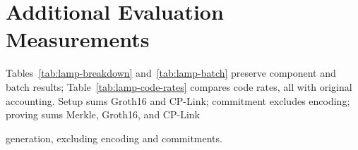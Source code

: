 \documentclass[conference,compsoc]{IEEEtran}
\makeatletter
\newcommand{\protocol}{\textsf{LAMP}}   %
\theoremstyle{plain}
\theoremstyle{definition}
\theoremstyle{remark}
\providecommand{\DIFaddtex}[1]{{\protect\color{blue}\uwave{#1}}} %
\providecommand{\DIFdeltex}[1]{{\protect\color{red}\sout{#1}}} %
\providecommand{\DIFaddbegin}{} %
\providecommand{\DIFaddend}{} %
\providecommand{\DIFdelbegin}{} %
\providecommand{\DIFdelend}{} %
\providecommand{\DIFadd}[1]{\texorpdfstring{\DIFaddtex{#1}}{#1}} %
\providecommand{\DIFdel}[1]{\texorpdfstring{\DIFdeltex{#1}}{}} %
\let\sout@orig\sout %
\renewcommand{\sout}[1]{\ifmmode\text{\sout@orig{\ensuremath{#1}}}\else\sout@orig{#1}\fi} %
\renewcommand{\DIFaddtex}[1]{{\protect\color{DiffBlue}#1}}
\renewcommand{\DIFdeltex}[1]{}
\makeatother
\begin{document}
\section{\DIFdelbegin \DIFdel{LAMP Results Across Code Rates}\DIFdelend \DIFaddbegin \DIFadd{Additional Evaluation Measurements}\DIFaddend }
\label{app:lamp-code-rates}
\DIFaddbegin \label{app:component-batch}
\DIFaddend 

\DIFaddbegin \DIFadd{Tables~\ref{tab:lamp-breakdown} and~\ref{tab:lamp-batch} preserve component and
batch results; }\DIFaddend Table~\ref{tab:lamp-code-rates} \DIFdelbegin \DIFdel{reports the performance of \(\protocol\) for
code rates\(\rho\in\{1/2,1/4,1/8\}\). The setup time is the sum of the
}\DIFdelend \DIFaddbegin \DIFadd{compares code rates, all with
original accounting. Setup sums }\DIFaddend Groth16 and CP-Link\DIFdelbegin \DIFdel{setup times.  Encoding and commitment generation are
reported separately, where commitment is the sum of the ABC and XYZ
commitment times and excludes
encoding.  Proving time is the sum of the
}\DIFdelend \DIFaddbegin \DIFadd{; commitment excludes
encoding; proving sums }\DIFaddend Merkle, Groth16, and CP-Link \DIFdelbegin \DIFdel{proof-generation times and excludes both encoding and commitment generation.
}%

\DIFdelend \DIFaddbegin \DIFadd{generation, excluding
encoding and commitments.
}\DIFaddend 
\end{document}
